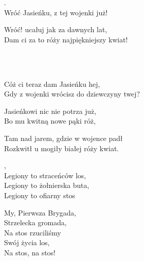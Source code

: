 \documentclass[12pt,a4paper,twoside]{songbook}
\begin{document}

  \begin{info}
    \lipsum[1]
  \end{info}
  
  \begin{lyrics}[longestline={Gdy z wojenki wrócisz do dziewczyny twej?}]
    .\\
    Wróć Jasieńku, z tej wojenki już!\\
    \begin{markverses}[marktext={powtórzcie to ludzie}]%
      Wróć! ucałuj jak za dawnych lat,\\
      Dam ci za to róży najpiękniejszy kwiat!
    \end{markverses}
    
    \\
    \\
    \begin{markverses}%
      Cóż ci teraz dam Jasieńku hej,\\
      Gdy z wojenki wrócisz do dziewczyny twej?
    \end{markverses}
    
    Jasieńkowi nic nie potrza już,\\
    Bo mu kwitną nowe pąki róż,\\
    \begin{markverses}%
      Tam nad jarem, gdzie w wojence padł\\
      Rozkwitł u mogiły białej róży kwiat.
    \end{markverses}
  \end{lyrics}


  \begin{info}
    \lipsum[1]
  \end{info}

  \begin{lyrics}[longestline=Legiony to straceńców los]
  , \\
  Legiony to straceńców los, \\
  Legiony to żołnierska buta, \\
  Legiony to ofiarny stos
  
  My, Pierwsza Brygada,\\
  Strzelecka gromada,\\
  Na stos rzuciliśmy\\
  Swój życia los,\\
  Na stos, na stos!
  \end{lyrics}
\end{document}
